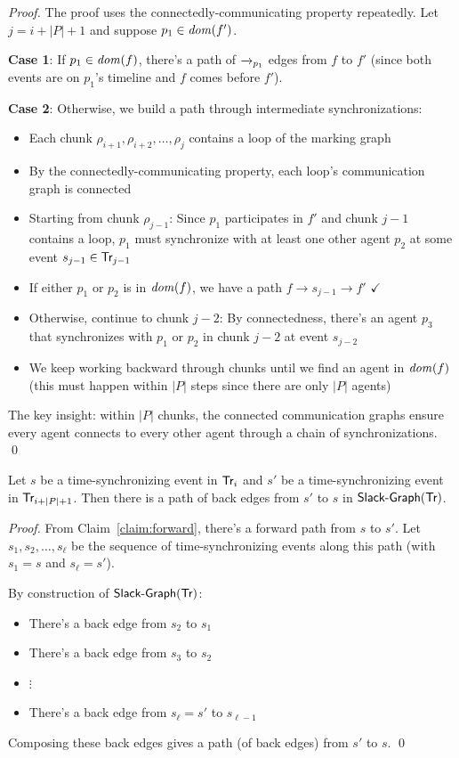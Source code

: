 \begin{proof}
The proof uses the connectedly-communicating property repeatedly. Let $j = i + |P| + 1$ and suppose $p_1 \in \mathit{dom}(f')$.

\textbf{Case 1}: If $p_1 \in \mathit{dom}(f)$, there's a path of $\xrightarrow{}_{p_1}$ edges from $f$ to $f'$ (since both events are on $p_1$'s timeline and $f$ comes before $f'$).

\textbf{Case 2}: Otherwise, we build a path through intermediate synchronizations:
\begin{itemize}
\item Each chunk $\rho_{i+1}, \rho_{i+2}, \ldots, \rho_j$ contains a loop of the marking graph
\item By the connectedly-communicating property, each loop's communication graph is connected
\item Starting from chunk $\rho_{j-1}$: Since $p_1$ participates in $f'$ and chunk $j-1$ contains a loop, $p_1$ must synchronize with at least one other agent $p_2$ at some event $s_{j-1} \in \textsf{Tr}_{j-1}$
\item If either $p_1$ or $p_2$ is in $\mathit{dom}(f)$, we have a path $f \to s_{j-1} \to f'$ $\checkmark$
\item Otherwise, continue to chunk $j-2$: By connectedness, there's an agent $p_3$ that synchronizes with $p_1$ or $p_2$ in chunk $j-2$ at event $s_{j-2}$
\item We keep working backward through chunks until we find an agent in $\mathit{dom}(f)$ (this must happen within $|P|$ steps since there are only $|P|$ agents)
\end{itemize}

The key insight: within $|P|$ chunks, the connected communication graphs ensure every agent connects to every other agent through a chain of synchronizations. \qed
\end{proof}

\begin{claim}\label{claim:backward}
Let $s$ be a time-synchronizing event in $\textsf{Tr}_i$ and $s'$ be a time-synchronizing event in $\textsf{Tr}_{i + |P| + 1}$. Then there is a path of back edges from $s'$ to $s$ in $\mathrm{\textsf{Slack-Graph}}(\textsf{Tr})$.
\end{claim}

\begin{proof}
From Claim~\ref{claim:forward}, there's a forward path from $s$ to $s'$. Let $s_1, s_2, \ldots, s_\ell$ be the sequence of time-synchronizing events along this path (with $s_1 = s$ and $s_\ell = s'$).

By construction of $\mathrm{\textsf{Slack-Graph}}(\textsf{Tr})$:
\begin{itemize}
\item There's a back edge from $s_2$ to $s_1$
\item There's a back edge from $s_3$ to $s_2$
\item $\vdots$
\item There's a back edge from $s_\ell = s'$ to $s_{\ell-1}$
\end{itemize}

Composing these back edges gives a path (of back edges) from $s'$ to $s$. \qed
\end{proof}


